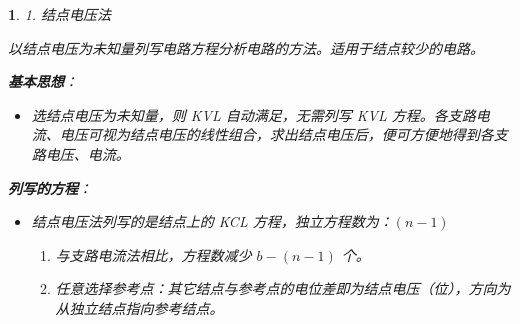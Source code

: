 \documentclass[UTF8]{report}
\theoremstyle{MyLineTheoremStyle} %
\theoremstyle{MyBlockTheoremStyle} %
\theoremstyle{MySubsubsectionStyle} %
\newtheorem{definition}{}
\begin{document}
\begin{definition}
    1. 结点电压法

    以结点电压为未知量列写电路方程分析电路的方法。适用于结点较少的电路。

    \textbf{基本思想}：
    \begin{itemize}
        \item 选结点电压为未知量，则 KVL 自动满足，无需列写 KVL 方程。各支路电流、电压可视为结点电压的线性组合，求出结点电压后，便可方便地得到各支路电压、电流。
    \end{itemize}

    \textbf{列写的方程}：
    \begin{itemize}
        \item 结点电压法列写的是结点上的 KCL 方程，独立方程数为：$(n - 1)$
        \begin{enumerate}
            \item 与支路电流法相比，方程数减少 $b - (n - 1)$ 个。
            \item 任意选择参考点：其它结点与参考点的电位差即为结点电压（位），方向为从独立结点指向参考结点。
        \end{enumerate}
    \end{itemize}
\end{definition}
\end{document}
